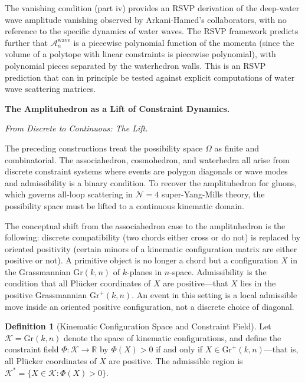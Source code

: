\documentclass[12pt, oneside]{amsart}
\theoremstyle{plain}
\theoremstyle{definition}
\newtheorem{definition}[theorem]{Definition}
\theoremstyle{remark}
\newcommand{\R}{\mathbb{R}}
\newcommand{\Gr}{\mathrm{Gr}}
\newcommand{\Phif}{\Phi}
\newcommand{\OmKS}{\Omega}
\newcommand{\Amp}{\mathcal{A}}
\begin{document}
The vanishing condition (part iv) provides an RSVP derivation of the deep-water wave amplitude vanishing observed by Arkani-Hamed's collaborators, with no reference to the specific dynamics of water waves. The RSVP framework predicts further that $\Amp_n^{\mathrm{wave}}$ is a piecewise polynomial function of the momenta (since the volume of a polytope with linear constraints is piecewise polynomial), with polynomial pieces separated by the waterhedron walls. This is an RSVP prediction that can in principle be tested against explicit computations of water wave scattering matrices.

\bigskip\noindent\textbf{The Amplituhedron as a Lift of Constraint Dynamics.}
\label{sec:amplituhedron}

\medskip\noindent\textit{From Discrete to Continuous: The Lift.}

The preceding constructions treat the possibility space $\OmKS$ as finite and combinatorial. The associahedron, cosmohedron, and waterhedra all arise from discrete constraint systems where events are polygon diagonals or wave modes and admissibility is a binary condition. To recover the amplituhedron for gluons, which governs all-loop scattering in $\mathcal{N}=4$ super-Yang-Mills theory, the possibility space must be lifted to a continuous kinematic domain.

The conceptual shift from the associahedron case to the amplituhedron is the following: discrete compatibility (two chords either cross or do not) is replaced by oriented positivity (certain minors of a kinematic configuration matrix are either positive or not). A primitive object is no longer a chord but a configuration $X$ in the Grassmannian $\Gr(k,n)$ of $k$-planes in $n$-space. Admissibility is the condition that all Pl\"ucker coordinates of $X$ are positive---that $X$ lies in the positive Grassmannian $\mathrm{Gr}^+(k,n)$. An event in this setting is a local admissible move inside an oriented positive configuration, not a discrete choice of diagonal.

\begin{definition}[Kinematic Configuration Space and Constraint Field]
Let $\mathcal{K} = \Gr(k,n)$ denote the space of kinematic configurations, and define the constraint field $\Phif: \mathcal{K} \to \R$ by $\Phif(X) > 0$ if and only if $X \in \mathrm{Gr}^+(k,n)$---that is, all Pl\"ucker coordinates of $X$ are positive. The admissible region is $\mathcal{K}^* = \{X \in \mathcal{K} : \Phif(X) > 0\}$.
\end{definition}
\end{document}
